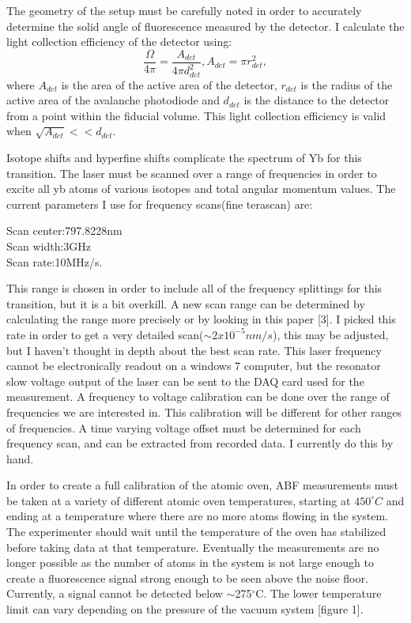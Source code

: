 \documentclass[12pt, a4paper]{article}
\begin{document}
The geometry of the setup must be carefully noted in order to accurately determine the solid angle of fluorescence measured by the detector. I calculate the light collection efficiency of the detector using:
\begin{equation}
\frac{\Omega}{4\pi} = \frac{A_{det}}{4\pi d_{det}^2},
A_{det} = \pi r_{det}^2,
\end{equation}
where $A_{det}$ is the area of the active area of the detector, $r_{det}$ is the radius of the active area of the avalanche photodiode and $d_{det}$ is the distance to the detector from a point within the fiducial volume. This light collection efficiency is valid when $\sqrt{A_{det}} << d_{det}$.

Isotope shifts and hyperfine shifts complicate the spectrum of Yb for this transition. The laser must be scanned over a range of frequencies in order to excite all yb atoms of various isotopes and total angular momentum values. The current parameters I use for frequency scans(fine terascan) are:\\
\begin{center}
Scan center:797.8228nm\\
Scan width:3GHz\\
Scan rate:10MHz/s.\\
\end{center}
This range is chosen in order to include all of the frequency splittings for this transition, but it is a bit overkill.  A new scan range can be determined by calculating the range more precisely or by looking in this paper [3]. I picked this rate in order to get a very detailed scan($\sim 2x10^{-5}nm/s$), this may be adjusted, but I haven't thought in depth about the best scan rate. This laser frequency cannot be electronically readout on a windows 7 computer, but the resonator slow voltage output of the laser can be sent to the DAQ card used for the measurement. A frequency to voltage calibration can be done over the range of frequencies we are interested in. This calibration will be different for other ranges of frequencies. A time varying voltage offset must be determined for each frequency scan, and can be extracted from recorded data. I currently do this by hand.

In order to create a full calibration of the atomic oven, ABF measurements must be taken at a variety of different atomic oven temperatures, starting at $450^{\circ}C$ and ending at a temperature where there are no more atoms flowing in the system. The experimenter should wait until the temperature of the oven has stabilized before taking data at that temperature. Eventually the measurements are no longer possible as the number of atoms in the system is not large enough to create a fluorescence signal strong enough to be seen above the noise floor. Currently, a signal cannot be detected below $\sim$275$^{\circ}$C. The lower temperature limit can vary depending on the pressure of the vacuum system [figure 1].
\end{document}
